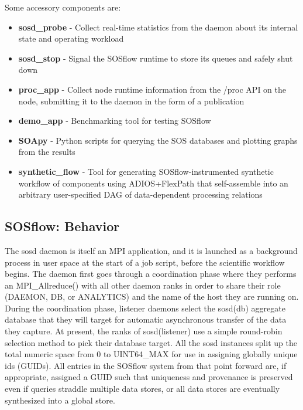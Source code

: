 Some accessory components are:
%
\begin{itemize}
    \item \textbf{sosd\_probe} - Collect real-time statistics from the daemon about
      its internal state and operating workload
    \item \textbf{sosd\_stop} - Signal the SOSflow runtime to store its queues and
      safely shut down
    \item \textbf{proc\_app} - Collect node runtime information from
      the /proc API on the node, submitting it to the daemon in the
      form of a publication
    \item \textbf{demo\_app} - Benchmarking tool for testing SOSflow
    \item \textbf{SOApy} - Python scripts for querying the SOS databases and plotting
      graphs from the results
    \item \textbf{synthetic\_flow} - Tool for generating SOSflow-instrumented
      synthetic workflow of components using ADIOS+FlexPath
      that self-assemble into an arbitrary  user-specified DAG of
      data-dependent processing relations
\end{itemize}

\subsection{SOSflow: Behavior}
%
The sosd daemon is itself an MPI application, and it is launched as a
background process in user space at the start of a job script, before
the scientific workflow begins.
%
The daemon first goes through a coordination phase where they performs
an MPI\_Allreduce() with all other daemon ranks in order to share
their role (DAEMON, DB, or ANALYTICS) and the name of the host they
are running on.
%
During the coordination phase, listener daemons select the sosd(db)
aggregate database that they will target for automatic asynchronous
transfer of the data they capture.
%
At present, the ranks of sosd(listener) use a simple round-robin
selection method to pick their database target.
%
All the sosd instances split up the total numeric space from 0 to
UINT64\_MAX for use in assigning globally unique ids (GUIDs).
%
All entries in the SOSflow system from that point forward are, if
appropriate, assigned a GUID such that uniqueness and provenance is
preserved even if queries straddle multiple data stores, or all data
stores are eventually synthesized into a global store.


